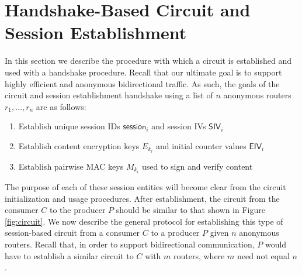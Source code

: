 \documentclass[10pt]{article}
\begin{document}
\section{Handshake-Based Circuit and Session Establishment}
In this section we describe the procedure with which a circuit is established and used with a handshake procedure. Recall that our ultimate goal is to support highly efficient and anonymous bidirectional traffic. As such, the goals of the circuit and session establishment handshake using a list of $n$ anonymous routers $r_1,\dots,r_n$ are as follows:
\begin{enumerate}
\item Establish unique session IDs $\mathsf{session}_{i}$ and session IVs $\mathsf{SIV}_i$
\item Establish content encryption keys $E_{k_i}$ and initial counter values $\mathsf{EIV}_i$
\item Establish pairwise MAC keys $M_{k_i}$ used to sign and verify content
\end{enumerate}
The purpose of each of these session entities will become clear from the circuit initialization and usage procedures. After establishment, the circuit from the consumer $C$ to the producer $P$ should be similar to that shown in Figure \ref{fig:circuit}. We now describe the general protocol for establishing this type of session-based circuit from a consumer $C$ to a producer $P$ given $n$ anonymous routers. Recall that, in order to support bidirectional communication, $P$ would have to establish a similar circuit to $C$ with $m$ routers, where $m$ need not equal $n$. 



\end{document}
